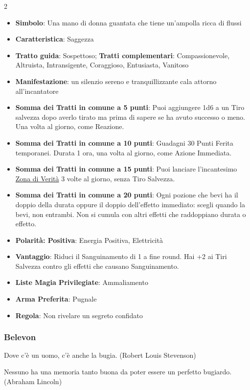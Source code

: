 \begin{multicols}{2}
\begin{itemize}[leftmargin=*] \setlength{\itemsep}{0pt}
\item \textbf{Simbolo}: Una mano di donna guantata che tiene un'ampolla ricca di flussi
\item \textbf{Caratteristica}: Saggezza
\item \textbf{Tratto guida}: Sospettoso; \textbf{Tratti complementari}: Compassionevole, Altruista, Intransigente, Coraggioso, Entusiasta, Vanitoso
\item \textbf{Manifestazione}: un silenzio sereno e tranquillizzante cala attorno all'incantatore
\item \textbf{Somma dei Tratti in comune a 5 punti}: Puoi aggiungere 1d6 a un Tiro salvezza dopo averlo tirato ma prima di sapere se ha avuto successo o meno. Una volta al giorno, come Reazione.
\item \textbf{Somma dei Tratti in comune a 10 punti}: Guadagni 30 Punti Ferita temporanei. Durata 1 ora, una volta al giorno, come Azione Immediata.
\item \textbf{Somma dei Tratti in comune a 15 punti}: Puoi lanciare l'incantesimo \hyperlink{Zona di Verità}{Zona di Verità} 3 volte al giorno, senza Tiro Salvezza.
\item \textbf{Somma dei Tratti in comune a 20 punti}: Ogni pozione che bevi ha il doppio della durata oppure il doppio dell'effetto immediato: scegli quando la bevi, non entrambi. Non si cumula con altri effetti che raddoppiano durata o effetto.
\item \textbf{Polarità: Positiva}: Energia Positiva, Elettricità
\item \textbf{Vantaggio}: Riduci il Sanguinamento di 1 a fine round. Hai +2 ai Tiri Salvezza contro gli effetti che causano Sanguinamento.
\item \textbf{Liste Magia Privilegiate}: Ammaliamento
\item \textbf{Arma Preferita}: Pugnale
\item \textbf{Regola}: Non rivelare un segreto confidato
\end{itemize}

\subsubsection{Belevon}\label{belevon}\hypertarget{belevon}{}

\begin{enfasi}{
Dove c'è un uomo, c'è anche la bugia. (Robert Louis Stevenson)

\medskip

Nessuno ha una memoria tanto buona da poter essere un perfetto bugiardo. (Abraham Lincoln)
}\end{enfasi}


\end{multicols}
